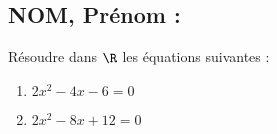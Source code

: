 \documentclass[a4paper,11pt,exos]{nsi} %
\begin{document}


\subsection*{NOM, Prénom : \dotfill} 

\maketitle

\begin{exercice}
    Résoudre dans $\R$ les équations suivantes :
    \begin{multicols}{2}
        \begin{enumerate}
            \item $2x^2-4x-6=0$
	        \item $2x^2-8x+12=0$
        \end{enumerate}
    \end{multicols}
    
\end{exercice}

\end{document}
